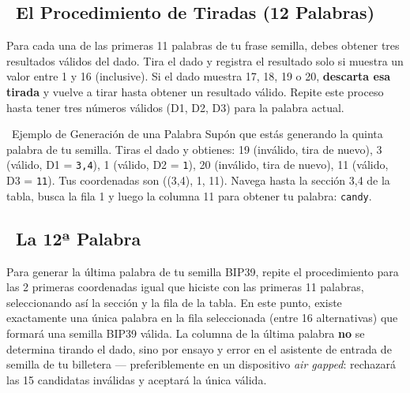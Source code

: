 \documentclass[10pt]{article}
\begin{document}
\subsection*{~El Procedimiento de Tiradas (12 Palabras)}

Para cada una de las primeras 11 palabras de tu frase semilla, debes obtener tres resultados válidos del dado. Tira el dado y registra el resultado solo si muestra un valor entre 1 y 16 (inclusive). Si el dado muestra 17, 18, 19 o 20, \textbf{descarta esa tirada} y vuelve a tirar hasta obtener un resultado válido. Repite este proceso hasta tener tres números válidos (D1, D2, D3) para la palabra actual.

\begin{examplebox}{\faLightbulb~Ejemplo de Generación de una Palabra}
Supón que estás generando la quinta palabra de tu semilla. Tiras el dado y obtienes: 19 (inválido, tira de nuevo), 3 (válido, D1 = \texttt{3,4}), 1 (válido, D2 = \texttt{1}), 20 (inválido, tira de nuevo), 11 (válido, D3 = \texttt{11}). Tus coordenadas son ((3,4), 1, 11). Navega hasta la sección 3,4 de la tabla, busca la fila 1 y luego la columna 11 para obtener tu palabra: \texttt{candy}.
\end{examplebox}

\subsection*{\faPen~La 12ª Palabra}

Para generar la última palabra de tu semilla BIP39, repite el procedimiento para las 2 primeras coordenadas igual que hiciste con las primeras 11 palabras, seleccionando así la sección y la fila de la tabla. En este punto, existe exactamente una única palabra en la fila seleccionada (entre 16 alternativas) que formará una semilla BIP39 válida. La columna de la última palabra \textbf{no} se determina tirando el dado, sino por ensayo y error en el asistente de entrada de semilla de tu billetera --- preferiblemente en un dispositivo \textit{air gapped}: rechazará las 15 candidatas inválidas y aceptará la única válida.
\end{document}
